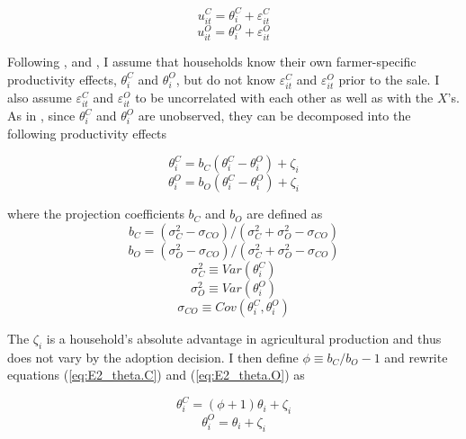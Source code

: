 \documentclass[11pt]{article}
\begin{document}
\begin{equation} \label{eq:E2_u.C}
    u^{C}_{it} = \theta^{C}_{i} + \varepsilon^{C}_{it}
\end{equation}
\begin{equation} \label{eq:E2_u.O}
    u^{O}_{it} = \theta^{O}_{i} + \varepsilon^{O}_{it}
\end{equation}

Following \citet{carniero-et.al.15}, \citet{michler-et.al.18} and \citet{suri11}, I assume that households know their own farmer-specific productivity effects, $\theta^{C}_{i}$ and $\theta^{O}_{i}$, but do not know $\varepsilon^{C}_{it}$ and $\varepsilon^{O}_{it}$ prior to the sale. I also assume $\varepsilon^{C}_{it}$ and $\varepsilon^{O}_{it}$ to be uncorrelated with each other as well as with the $X$’s.
As in \citet{lemueux.98}, since $\theta^{C}_{i}$ and $\theta^{O}_{i}$ are unobserved, they can be decomposed into the following productivity effects %

\begin{equation} \label{eq:E2_theta.C}
    \theta^{C}_{i} = b_{C}(\theta^{C}_{i} - \theta^{O}_{i}) + \zeta_{i}
\end{equation}
\begin{equation} \label{eq:E2_theta.O}
    \theta^{O}_{i} = b_{O}(\theta^{C}_{i} - \theta^{O}_{i}) + \zeta_{i}
\end{equation}

where the projection coefficients $b_{C}$ and $b_{O}$ are defined as \singlespacing
$$b_{C} = (\sigma^{2}_{C} - \sigma_{CO}) / (\sigma^{2}_{C} + \sigma^{2}_{O} - \sigma_{CO})$$ 
$$b_{O} = (\sigma^{2}_{O} - \sigma_{CO}) / (\sigma^{2}_{C} + \sigma^{2}_{O} - \sigma_{CO})$$
$$\sigma^{2}_{C} \equiv Var(\theta^{C}_{i})$$
$$\sigma^{2}_{O} \equiv Var(\theta^{O}_{i})$$
$$\sigma_{CO} \equiv Cov(\theta^{C}_{i},\theta^{O}_{i})$$
\doublespacing

The $\zeta_{i}$ is a household’s absolute advantage in agricultural production and thus does not vary by the adoption decision.
I then define $\phi \equiv b_C / b_O - 1$ and rewrite equations (\ref{eq:E2_theta.C}) and (\ref{eq:E2_theta.O}) as

\begin{equation} \label{eq:E2_theta2.C}
    \theta^{C}_{i} = (\phi + 1)\theta_{i} + \zeta_i
\end{equation}
\begin{equation} \label{eq:E2_theta2.O}
    \theta^{O}_{i} = \theta_{i} + \zeta_i
\end{equation}
\end{document}
